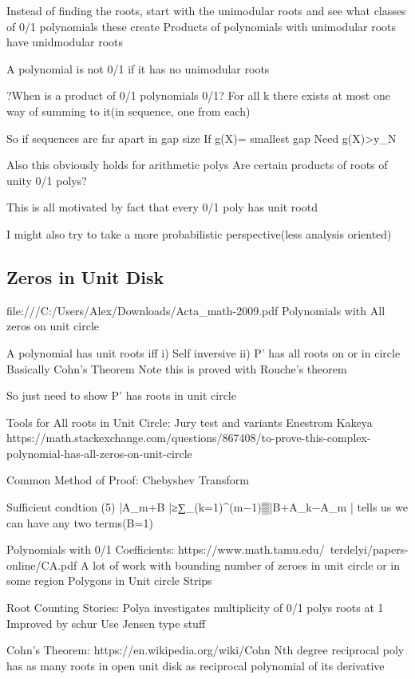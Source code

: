 \documentclass[11pt]{article}
\theoremstyle{remark}
\begin{document}
Instead of finding the roots, start with the unimodular roots and see what classes of 0/1 polynomials these create
	Products of polynomials with unimodular roots have unidmodular roots
	
	A polynomial is not 0/1 if it has no unimodular roots
	
	?When is a product of 0/1 polynomials 0/1?
		For all k there exists at most one way of summing to it(in sequence, one from each)
		
		So if sequences are far apart in gap size
			If g(X)= smallest gap
			Need g(X)>y_N
			
		Also this obviously holds for arithmetic polys
	Are certain products of roots of unity 0/1 polys?
			
This is all motivated by fact that every 0/1 poly has unit rootd

I might also try to take a more probabilistic perspective(less analysis oriented)

\subsection{Zeros in Unit Disk}

file:///C:/Users/Alex/Downloads/Acta_math-2009.pdf
Polynomials with All zeros on unit circle

A polynomial has unit roots iff 
	i) Self inversive
	ii) P' has all roots on or in circle
Basically Cohn's Theorem
	Note this is proved with Rouche's theorem

So just need to show P' has roots in unit circle

Tools for All roots in Unit Circle:
	Jury test and variants
	Enestrom Kakeya
	https://math.stackexchange.com/questions/867408/to-prove-this-complex-polynomial-has-all-zeros-on-unit-circle

Common Method of Proof: Chebyshev Transform

Sufficient condtion (5)  |A_m+B |≥∑_(k=1)^(m−1)▒|B+A_k−A_m |   tells us we can have any two terms(B=1)

Polynomials with 0/1 Coefficients: https://www.math.tamu.edu/~terdelyi/papers-online/CA.pdf
	A lot of work with bounding number of zeroes in unit circle or in some region
		Polygons in Unit circle
		Strips
		
Root Counting Stories:
	Polya investigates multiplicity of 0/1 polys roots at 1
	Improved by schur
	Use Jensen type stuff
	
Cohn's Theorem: https://en.wikipedia.org/wiki/Cohn%
Nth degree reciprocal poly has as many roots in open unit disk as reciprocal polynomial of its derivative
\end{document}
